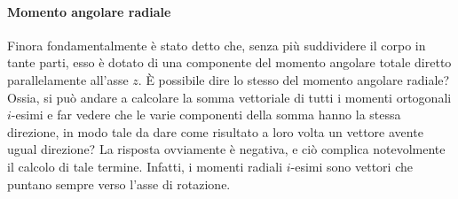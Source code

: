 \documentclass[10pt,a4paper]{book}
\begin{document}
\paragraph{Momento angolare radiale} Finora fondamentalmente è stato detto che, senza più suddividere il corpo in tante parti, esso è dotato di una componente del momento angolare totale diretto parallelamente all'asse $z$. È possibile dire lo stesso del momento angolare radiale? Ossia, si può andare a calcolare la somma vettoriale di tutti i momenti ortogonali $i$-esimi e far vedere che le varie componenti della somma hanno la stessa direzione, in modo tale da dare come risultato a loro volta un vettore avente ugual direzione? La risposta ovviamente è negativa, e ciò complica notevolmente il calcolo di tale termine. Infatti, i momenti radiali $i$-esimi sono vettori che puntano sempre verso l'asse di rotazione.
\end{document}
